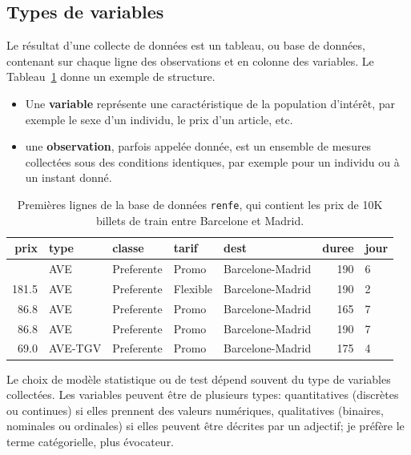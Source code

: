 \documentclass[
  11pt,
  letterpaper,
]{scrbook}
\providecommand{\tightlist}{%
  \setlength{\itemsep}{0pt}\setlength{\parskip}{0pt}}\usepackage{longtable,booktabs,array}
\theoremstyle{definition}
\theoremstyle{definition}
\theoremstyle{remark}
\begin{document}
\subsection{Types de variables}\label{types-de-variables}

Le résultat d'une collecte de données est un tableau, ou base de
données, contenant sur chaque ligne des observations et en colonne des
variables. Le Tableau~\ref{tbl-data-renfe} donne un exemple de
structure.

\begin{itemize}
\tightlist
\item
  Une \textbf{variable} représente une caractéristique de la population
  d'intérêt, par exemple le sexe d'un individu, le prix d'un article,
  etc.
\item
  une \textbf{observation}, parfois appelée donnée, est un ensemble de
  mesures collectées sous des conditions identiques, par exemple pour un
  individu ou à un instant donné.
\end{itemize}

\begin{longtable}[]{@{}rllllrl@{}}

\caption{\label{tbl-data-renfe}Premières lignes de la base de données
\texttt{renfe}, qui contient les prix de 10K billets de train entre
Barcelone et Madrid.}

\tabularnewline

\toprule\noalign{}
prix & type & classe & tarif & dest & duree & jour \\
\midrule\noalign{}
\endhead
\bottomrule\noalign{}
\endlastfoot
143.4 & AVE & Preferente & Promo & Barcelone-Madrid & 190 & 6 \\
181.5 & AVE & Preferente & Flexible & Barcelone-Madrid & 190 & 2 \\
86.8 & AVE & Preferente & Promo & Barcelone-Madrid & 165 & 7 \\
86.8 & AVE & Preferente & Promo & Barcelone-Madrid & 190 & 7 \\
69.0 & AVE-TGV & Preferente & Promo & Barcelone-Madrid & 175 & 4 \\

\end{longtable}

Le choix de modèle statistique ou de test dépend souvent du type de
variables collectées. Les variables peuvent être de plusieurs types:
quantitatives (discrètes ou continues) si elles prennent des valeurs
numériques, qualitatives (binaires, nominales ou ordinales) si elles
peuvent être décrites par un adjectif; je préfère le terme catégorielle,
plus évocateur.
\end{document}
